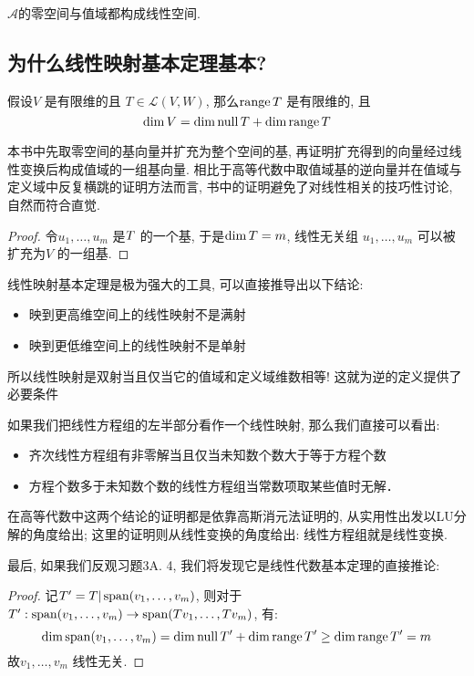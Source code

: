 \(\mathscr{A}\)的零空间与值域都构成线性空间.

\subsection{为什么线性映射基本定理基本?}

\begin{theorem}
    假设\(V\) 是有限维的且 \(T \in \mathscr{L}(V,W)\), 那么\(\operatorname{range}
    T\) 是有限维的, 且\[
        \dim V = \dim \operatorname{null} T + \dim \operatorname{range} T
    \]
\end{theorem}
本书中先取零空间的基向量并扩充为整个空间的基, 再证明扩充得到的向量经过线性变换后构成值域的一组基向量.
相比于高等代数中取值域基的逆向量并在值域与定义域中反复横跳的证明方法而言,
书中的证明避免了对线性相关的技巧性讨论, 自然而符合直觉.

\begin{proof}
    令\(u_1, \dots , u_{m}\) 是\(\null T\) 的一个基, 于是\(\dim
    \null T = m\), 线性无关组 \(u_{1}, \dots ,u_{m}\) 可以被扩充为\(V\) 的一组基.
\end{proof}

线性映射基本定理是极为强大的工具, 可以直接推导出以下结论:

\begin{itemize}
    \item 映到更高维空间上的线性映射不是满射
    \item 映到更低维空间上的线性映射不是单射
\end{itemize}
所以线性映射是双射当且仅当它的值域和定义域维数相等! 这就为逆的定义提供了必要条件

如果我们把线性方程组的左半部分看作一个线性映射, 那么我们直接可以看出:
\begin{itemize}
    \item 齐次线性方程组有非零解当且仅当未知数个数大于等于方程个数
    \item 方程个数多于未知数个数的线性方程组当常数项取某些值时无解．
\end{itemize}

在高等代数中这两个结论的证明都是依靠高斯消元法证明的, 从实用性出发以LU分解的角度给出;
这里的证明则从线性变换的角度给出: 线性方程组就是线性变换.

最后, 如果我们反观习题3A. 4, 我们将发现它是线性代数基本定理的直接推论:
\begin{proof}
    记\(T'= T|\operatorname{span}(v_{1}, \dots, v_{m})\),
    则对于\(T': \operatorname{span}(v_{1}, \dots, v_{m}) \to
    \operatorname{span}(Tv_{1}, \dots, Tv_{m})\), 有:
    \[
        \dim \operatorname{span}(v_{1}, \dots, v_{m}) = \dim
        \operatorname{null} T' +
        \dim \operatorname{range} T' \geq \dim \operatorname{range} T' = m
    \]
    故\(v_{1}, \dots, v_{m}\) 线性无关.
\end{proof}

